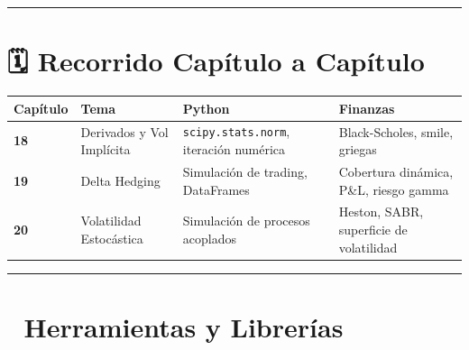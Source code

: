 \documentclass[
  spanish,
  letterpaper,
  DIV=11,
  numbers=noendperiod]{scrreprt}
\begin{document}
\begin{center}\rule{0.5\linewidth}{0.5pt}\end{center}

\section*{🗓️ Recorrido Capítulo a
Capítulo}\label{recorrido-capuxedtulo-a-capuxedtulo-3}


\begin{longtable}[]{@{}
  >{\centering\arraybackslash}p{}
  >{\raggedright\arraybackslash}p{}
  >{\raggedright\arraybackslash}p{}
  >{\raggedright\arraybackslash}p{}@{}}
\toprule\noalign{}
\begin{minipage}[b]{\linewidth}\centering
Capítulo
\end{minipage} & \begin{minipage}[b]{\linewidth}\raggedright
Tema
\end{minipage} & \begin{minipage}[b]{\linewidth}\raggedright
Python
\end{minipage} & \begin{minipage}[b]{\linewidth}\raggedright
Finanzas
\end{minipage} \\
\midrule\noalign{}
\endhead
\bottomrule\noalign{}
\endlastfoot
\textbf{18} & Derivados y Vol Implícita & \texttt{scipy.stats.norm},
iteración numérica & Black-Scholes, smile, griegas \\
\textbf{19} & Delta Hedging & Simulación de trading, DataFrames &
Cobertura dinámica, P\&L, riesgo gamma \\
\textbf{20} & Volatilidad Estocástica & Simulación de procesos acoplados
& Heston, SABR, superficie de volatilidad \\
\end{longtable}

\begin{center}\rule{0.5\linewidth}{0.5pt}\end{center}

\section*{🧰 Herramientas y
Librerías}\label{herramientas-y-libreruxedas-3}
\end{document}
